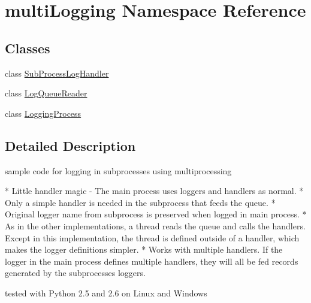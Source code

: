 \section{multi\-Logging Namespace Reference}
\label{namespacemultiLogging}
\subsection*{Classes}
\begin{DoxyCompactItemize}
\item 
class \hyperlink{classmultiLogging_1_1SubProcessLogHandler}{Sub\-Process\-Log\-Handler}
\item 
class \hyperlink{classmultiLogging_1_1LogQueueReader}{Log\-Queue\-Reader}
\item 
class \hyperlink{classmultiLogging_1_1LoggingProcess}{Logging\-Process}
\end{DoxyCompactItemize}


\subsection{Detailed Description}
\begin{DoxyVerb}sample code for logging in subprocesses using multiprocessing

* Little handler magic - The main process uses loggers and handlers as normal.
* Only a simple handler is needed in the subprocess that feeds the queue.
* Original logger name from subprocess is preserved when logged in main
  process.
* As in the other implementations, a thread reads the queue and calls the
  handlers. Except in this implementation, the thread is defined outside of a
  handler, which makes the logger definitions simpler.
* Works with multiple handlers.  If the logger in the main process defines
  multiple handlers, they will all be fed records generated by the
  subprocesses loggers.

tested with Python 2.5 and 2.6 on Linux and Windows\end{DoxyVerb}
 